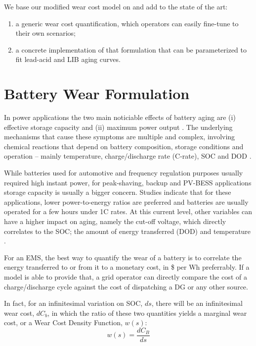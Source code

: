\documentclass{ieeeaccess}
\begin{document}
    We base our modified wear cost model on \cite{HAN2014} and add to the state of the art:
	\begin{enumerate}[i]
    	\item a generic wear cost quantification, which operators can easily fine-tune to their own scenarios;
    	\item a concrete implementation of that formulation that can be parameterized to fit lead-acid and \ac{LIB} aging curves.
    \end{enumerate}

\section{Battery Wear Formulation}

    In power applications the two main noticiable effects of battery aging are (i) effective storage capacity and (ii) maximum power output \cite{han2014comparative, chemali2015minimizing, al2010mathematical}. The underlying mechanisms that cause these symptoms are multiple and complex, involving chemical reactions that depend on battery composition, storage conditions and operation -- mainly temperature, charge/discharge rate (C-rate), \ac{SOC} and \ac{DOD} \cite{xiong2020lithium, vetter2005ageing, calearo2019modeling}.

    While batteries used for automotive and frequency regulation purposes usually required high instant power, for peak-shaving, backup and \ac{PV}-\ac{BESS} applications storage capacity is usually a bigger concern. Studies \cite{hesse2017lithium, sufyan2019optimal, asano2007methodology} indicate that for these applications, lower power-to-energy ratios are preferred and batteries are usually operated for a few hours under 1C rates. At this current level, other variables can have a higher impact on aging, namely the cut-off voltage, which directly correlates to the \ac{SOC}; the amount of energy transferred (\ac{DOD}) and temperature \cite{HAN2014}.

    For an \ac{EMS}, the best way to quantify the wear of a battery is to correlate the energy transferred to or from it to a monetary cost, in \$ per Wh preferrably. If a model is able to provide that, a grid operator can directly compare the cost of a charge/discharge cycle against the cost of dispatching a \ac{DG} or any other source.

    In fact, for an infinitesimal variation on \ac{SOC}, $ds$, there will be an infinitesimal wear cost, $dC_b$, in which the ratio of these two quantities yields a marginal wear cost, or a Wear Cost Density Function, $w(s)$:
	$$ w(s) = \frac{dC_B}{ds} $$
\end{document}
